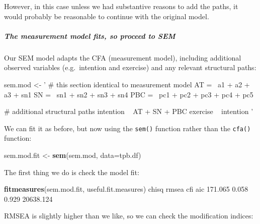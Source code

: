 \documentclass[]{article}
\newenvironment{Shaded}{\begin{snugshade}}{\end{snugshade}}
\newcommand{\DataTypeTok}[1]{\textcolor[rgb]{0.13,0.29,0.53}{#1}}
\newcommand{\FloatTok}[1]{\textcolor[rgb]{0.00,0.00,0.81}{#1}}
\newcommand{\KeywordTok}[1]{\textcolor[rgb]{0.13,0.29,0.53}{\textbf{#1}}}
\newcommand{\NormalTok}[1]{#1}
\newcommand{\StringTok}[1]{\textcolor[rgb]{0.31,0.60,0.02}{#1}}
\let\oldsubparagraph\subparagraph
\renewcommand{\subparagraph}[1]{\oldsubparagraph{#1}\mbox{}}
\begin{document}
However, in this case unless we had substantive reasons to add the paths, it
would probably be reasonable to continue with the original model.

\hypertarget{the-measurement-model-fits-so-proceed-to-sem}{%
\subparagraph{The measurement model fits, so proceed to SEM}\label{the-measurement-model-fits-so-proceed-to-sem}}

Our SEM model adapts the CFA (measurement model), including additional observed
variables (e.g.~intention and exercise) and any relevant structural paths:

\begin{Shaded}
\begin{Highlighting}[]
\NormalTok{sem.mod <-}\StringTok{ '}
\StringTok{  # this section identical to measurement model}
\StringTok{  AT =~ a1 + a2 + a3 + sn1}
\StringTok{  SN =~ sn1 + sn2 + sn3 + sn4}
\StringTok{  PBC =~ pc1 + pc2 + pc3 + pc4 + pc5}

\StringTok{  # additional structural paths}
\StringTok{  intention ~ AT + SN + PBC}
\StringTok{  exercise ~ intention}
\StringTok{'}
\end{Highlighting}
\end{Shaded}

We can fit it as before, but now using the \texttt{sem()} function rather than the
\texttt{cfa()} function:

\begin{Shaded}
\begin{Highlighting}[]
\NormalTok{sem.mod.fit <-}\StringTok{ }\KeywordTok{sem}\NormalTok{(sem.mod, }\DataTypeTok{data=}\NormalTok{tpb.df)}
\end{Highlighting}
\end{Shaded}

The first thing we do is check the model fit:

\begin{Shaded}
\begin{Highlighting}[]
\KeywordTok{fitmeasures}\NormalTok{(sem.mod.fit, useful.fit.measures)}
\NormalTok{    chisq     rmsea       cfi       aic }
  \FloatTok{171.065}     \FloatTok{0.058}     \FloatTok{0.929} \FloatTok{20638.124} 
\end{Highlighting}
\end{Shaded}

RMSEA is slightly higher than we like, so we can check the modification indices:
\end{document}
